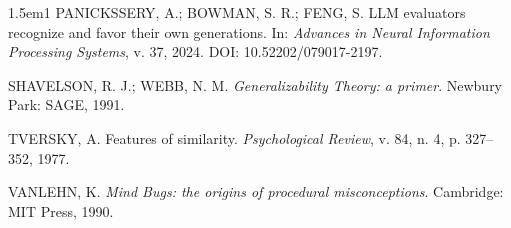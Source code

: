\documentclass[11pt,a4paper]{article}
\begin{document}
\begin{hangparas}{1.5em}{1}
PANICKSSERY, A.; BOWMAN, S. R.; FENG, S. LLM evaluators recognize and favor their own generations. In: \emph{Advances in Neural Information Processing Systems}, v. 37, 2024. DOI: 10.52202/079017-2197.\par

SHAVELSON, R. J.; WEBB, N. M. \emph{Generalizability Theory: a primer}. Newbury Park: SAGE, 1991.\par

TVERSKY, A. Features of similarity. \emph{Psychological Review}, v. 84, n. 4, p. 327--352, 1977.\par

VANLEHN, K. \emph{Mind Bugs: the origins of procedural misconceptions}. Cambridge: MIT Press, 1990.\par
\end{hangparas}
\endgroup
\end{document}
